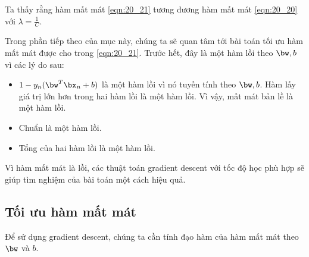 Ta thấy rằng hàm mất mát \eqref{eqn:20_21} tương đương hàm mất mát
\eqref{eqn:20_20} với $\lambda = \frac{1}{C}$. 
 
Trong phần tiếp theo của mục này, chúng ta sẽ quan tâm tới bài toán tối ưu hàm
mất mát được cho trong \eqref{eqn:20_21}. Trước hết, đây là một hàm lồi theo
$\bw, b$ vì các lý do sau: 
\begin{itemize}
    \item $1 - y_n(\bw^T\bx_n + b)$ là một hàm lồi vì nó tuyến tính theo $\bw, b$. Hàm lấy giá trị lớn hơn trong hai hàm lồi là một hàm lồi. Vì
    vậy, mất mát bản lề là một hàm lồi. 

    \item Chuẩn là một hàm lồi. 

    \item Tổng của hai hàm lồi là một hàm lồi. 

\end{itemize}
Vì hàm mất mát là lồi, các thuật toán gradient descent với tốc độ học phù hợp sẽ giúp tìm nghiệm của bài toán một cách hiệu quả. 

\subsection{Tối ưu hàm mất mát}
Để sử dụng gradient descent, chúng ta cần
tính đạo hàm của hàm mất mát theo $\bw$ và $b$. 

